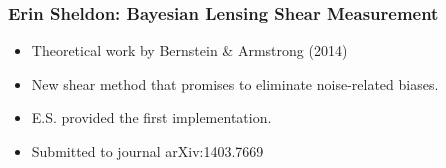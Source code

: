 \documentclass{beamer}
\begin{document}
%
%


\frame
{
    \frametitle{Erin Sheldon: Bayesian Lensing Shear Measurement}

    \begin{itemize}
        \item Theoretical work by Bernstein \& Armstrong (2014)
        \item New shear method that promises to eliminate noise-related biases.
        \item E.S. provided the first implementation.
        \item Submitted to journal arXiv:1403.7669
    \end{itemize}
}
\end{document}

